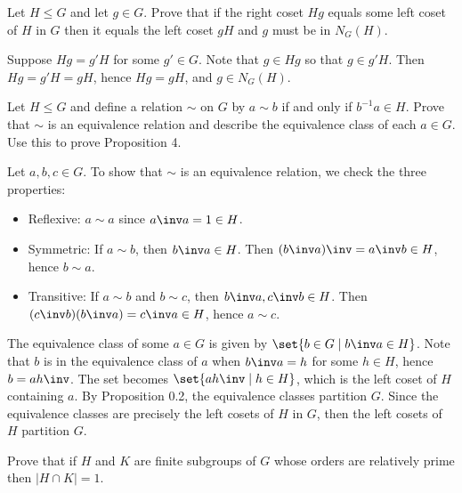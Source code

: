 \begin{exercise}\label{ex3.2.6}
    Let $H \leq G$ and let $g \in G$. Prove that if the right coset $Hg$ equals some left coset of $H$ in $G$ then it equals the left coset $gH$ and $g$ must be in $N_G(H)$.
\end{exercise}

\begin{sol}
    Suppose $Hg = g'H$ for some $g' \in G$. Note that $g \in Hg$ so that $g \in g'H$. Then $Hg = g'H = gH$, hence $Hg = gH$, and $g \in N_G(H)$.
\end{sol}

\begin{specialexercise}\label{ex3.2.7}
    Let $H \leq G$ and define a relation $\sim$ on $G$ by $a \sim b$ if and only if $b^{-1}a \in H$. Prove that $\sim$ is an equivalence relation and describe the equivalence class of each $a \in G$. Use this to prove Proposition 4.
\end{specialexercise}

\begin{sol}
    Let $a, b, c \in G$. To show that $\sim$ is an equivalence relation, we check the three properties:
    \begin{itemize}
        \item Reflexive: $a \sim a$ since $a\inv a = 1 \in H$.
        \item Symmetric: If $a \sim b$, then $b\inv a \in H$. Then $(b\inv a)\inv = a\inv b \in H$, hence $b \sim a$.
        \item Transitive: If $a \sim b$ and $b \sim c$, then $b\inv a, c\inv b \in H$. Then $(c\inv b)(b\inv a) = c\inv a \in H$, hence $a \sim c$.
    \end{itemize}

    The equivalence class of some $a \in G$ is given by $\set{b \in G \mid b\inv a \in H}$. Note that $b$ is in the equivalence class of $a$ when $b\inv a = h$ for some $h \in H$, hence $b = ah\inv$. The set becomes $\set{ah\inv \mid h \in H}$, which is the left coset of $H$ containing $a$. By Proposition 0.2, the equivalence classes partition $G$. Since the equivalence classes are precisely the left cosets of $H$ in $G$, then the left cosets of $H$ partition $G$.
\end{sol}

\begin{exercise}\label{ex3.2.8}
    Prove that if $H$ and $K$ are finite subgroups of $G$ whose orders are relatively prime then $|H \cap K| = 1$.
\end{exercise}

